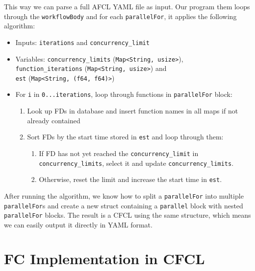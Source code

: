 This way we can parse a full AFCL YAML file as input. Our program them loops through the \texttt{workflowBody} and
for each \texttt{parallelFor}, it applies the following algorithm:

\begin{itemize}
  \item Inputs: \texttt{iterations} and \texttt{concurrency\_limit}
  \item Variables: \texttt{concurrency\_limits} (\texttt{Map<String, usize>}), \\ \texttt{function\_iterations} (\texttt{Map<String, usize>}) and \\ \texttt{est} (\texttt{Map<String, (f64, f64)>})
  \item For \texttt{i} in \texttt{0...iterations}, loop through functions in \texttt{parallelFor} block:
    \begin{enumerate}
      \item Look up FDs in database and insert function names in all maps if not already contained
      \item Sort FDs by the start time stored in \texttt{est} and loop through them:
        \begin{enumerate}
          \item If FD has not yet reached the \texttt{concurrency\_limit} in \texttt{concurrency\_limits}, select it and update \texttt{concurrency\_limits}.
          \item Otherwise, reset the limit and increase the start time in \texttt{est}.
        \end{enumerate}
  \end{enumerate}
\end{itemize}

After running the algorithm, we know how to split a \texttt{parallelFor} into multiple \texttt{parallelFor}s and
create a new struct containing a \texttt{parallel} block with nested \texttt{parallelFor} blocks. The result is a
CFCL using the same structure, which means we can easily output it directly in YAML format.



%
%
%
\section{FC Implementation in CFCL}

